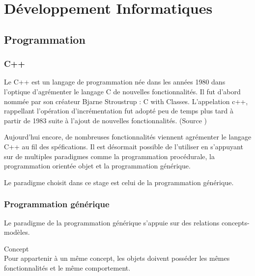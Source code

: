 \section{Développement Informatiques}

\subsection{Programmation}

\subsubsection{C++}


Le C++ est un langage de programmation née dans les années 1980 dans l'optique d'agrémenter le langage C de nouvelles fonctionnalités. Il fut d'abord nommée par son créateur Bjarne Stroustrup : C with Classes. L'appelation c++, rappellant l'opération d'incrémentation fut adopté peu de temps plus tard à partir de 1983 suite à l'ajout de nouvelles fonctionnalités. (Source \cite{Wiki-cpp})

Aujourd'hui encore, de nombreuses fonctionnalités viennent agrémenter le langage C++ au fil des spéfications. Il est désormait possible de l'utiliser en s'appuyant sur de multiples paradigmes comme la programmation procédurale, la programmation orientée objet et la programmation générique.

Le paradigme choisit dans ce stage est celui de la programmation générique. \cite{troussil-cpp}

\subsubsection{Programmation générique}


Le paradigme de la programmation générique s'appuie sur des relations concepts-modèles. 

\begin{Definition}{Concept}\\
\label{def:cpp-con}
    Pour appartenir à un même concept, les objets doivent posséder les mêmes fonctionnalités et le même comportement. 
\end{Definition}

